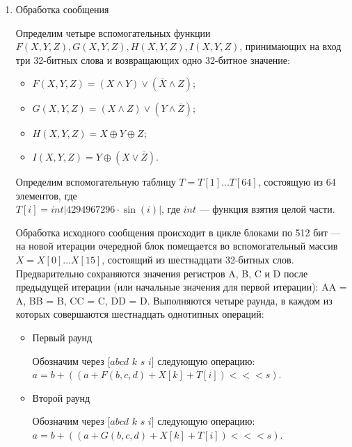 \documentclass{./civarticle}
\begin{document}
\begin{enumerate}
    \item Обработка сообщения

    Определим четыре вспомогательных функции $F(X, Y, Z), G(X, Y, Z), H(X, Y, Z), I(X, Y, Z)$, принимающих на вход три 32-битных слова и возвращающих одно 32-битное значение:

    \begin{itemize}
        \item $F(X, Y, Z) = (X \wedge Y) \vee (\bar X \wedge Z)$;
        \item $G(X, Y, Z) = (X \wedge Z) \vee (Y \wedge \bar Z)$;
        \item $H(X, Y, Z) = X \oplus Y \oplus Z$;
        \item $I(X, Y, Z) = Y \oplus (X \vee \bar Z)$.
    \end{itemize}

    Определим вспомогательную таблицу $T = T[1] ... T[64]$, состоящую из 64 элементов, где \\ $T[i] = int|4294967296 \cdot \sin(i)|$, где $int$ --- функция взятия целой части. 

    Обработка исходного сообщения происходит в цикле блоками по 512 бит --- на новой итерации очередной блок помещается во вспомогательный массив $X = X[0] ... X[15]$, состоящий из шестнадцати 32-битных слов. Предварительно сохраняются значения регистров A, B, C и D после предыдущей итерации (или начальные значения для первой итерации): AA = A, BB = B, CC = C, DD = D. Выполняются четыре раунда, в каждом из которых совершаются шестнадцать однотипных операций:

    \begin{itemize}
        \item Первый раунд

        Обозначим через $[abcd$ $k$ $s$ $i]$ следующую операцию: $a = b + ((a + F(b,c,d) + X[k] + T[i]) <<< s)$.

        \begin{figure}[h!]
        \end{figure}

        \item Второй раунд

        Обозначим через $[abcd$ $k$ $s$ $i]$ следующую операцию: $a = b + ((a + G(b,c,d) + X[k] + T[i]) <<< s)$.


\end{itemize}
\end{enumerate}
\end{document}
